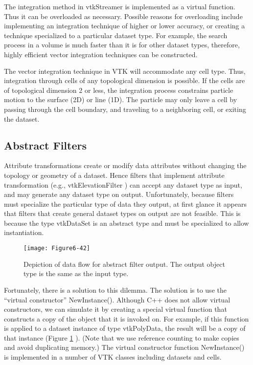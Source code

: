 The integration method in vtkStreamer is implemented as a virtual function. Thus it can be overloaded as necessary. Possible reasons for overloading include implementing an integration technique of higher or lower accuracy, or creating a technique specialized to a particular dataset type. For example, the search process in a volume is much faster than it is for other dataset types, therefore, highly efficient vector integration techniques can be constructed.

The vector integration technique in VTK will accommodate any cell type. Thus, integration through cells of any topological dimension is possible. If the cells are of topological dimension 2 or less, the integration process constrains particle motion to the surface (2D) or line (1D). The particle may only leave a cell by passing through the cell boundary, and traveling to a neighboring cell, or exiting the dataset.

\subsection{Abstract Filters}

Attribute transformations create or modify data attributes without changing the topology or geometry of a dataset. Hence filters that implement attribute transformation (e.g., vtkElevationFilter ) can accept any dataset type as input, and may generate any dataset type on output. Unfortunately, because filters must specialize the particular type of data they output, at first glance it appears that filters that create general dataset types on output are not feasible. This is because the type vtkDataSet is an abstract type and must be specialized to allow instantiation.

\begin{figure}[!htb]
	\texttt{[image: Figure6-42]}
	\caption{Depiction of data flow for abstract filter output. The output object type is the same as the input type.}\label{fig:Figure6-42}
\end{figure}


Fortunately, there is a solution to this dilemma. The solution is to use the ``virtual constructor'' NewInstance(). Although C++ does not allow virtual constructors, we can simulate it by creating a special virtual function that constructs a copy of the object that it is invoked on. For example, if this function is applied to a dataset instance of type vtkPolyData, the result will be a copy of that instance (Figure \ref{fig:Figure6-42} ). (Note that we use reference counting to make copies and avoid duplicating memory.) The virtual constructor function NewInstance() is implemented in a number of VTK classes including datasets and cells.

